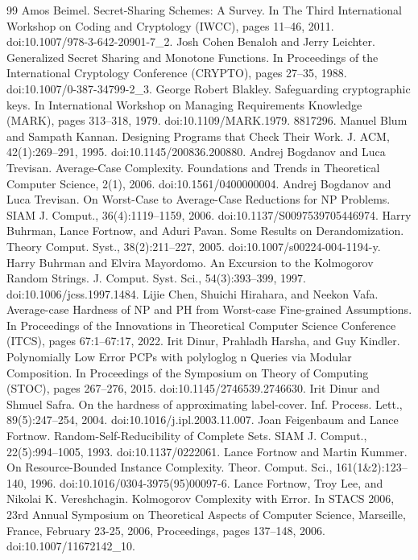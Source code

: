 \begin{thebibliography}{99}
 Amos Beimel. Secret-Sharing Schemes: A Survey. In The Third International Workshop on Coding and Cryptology (IWCC), pages 11–46, 2011. doi:10.1007/978-3-642-20901-7\_2.
 Josh Cohen Benaloh and Jerry Leichter. Generalized Secret Sharing and Monotone Functions. In Proceedings of the International Cryptology Conference (CRYPTO), pages 27–35, 1988. doi:10.1007/0-387-34799-2\_3.
 George Robert Blakley. Safeguarding cryptographic keys. In International Workshop on Managing Requirements Knowledge (MARK), pages 313–318, 1979. doi:10.1109/MARK.1979. 8817296.
 Manuel Blum and Sampath Kannan. Designing Programs that Check Their Work. J. ACM, 42(1):269–291, 1995. doi:10.1145/200836.200880.
 Andrej Bogdanov and Luca Trevisan. Average-Case Complexity. Foundations and Trends in Theoretical Computer Science, 2(1), 2006. doi:10.1561/0400000004.
 Andrej Bogdanov and Luca Trevisan. On Worst-Case to Average-Case Reductions for NP Problems. SIAM J. Comput., 36(4):1119–1159, 2006. doi:10.1137/S0097539705446974.
 Harry Buhrman, Lance Fortnow, and Aduri Pavan. Some Results on Derandomization. Theory Comput. Syst., 38(2):211–227, 2005. doi:10.1007/s00224-004-1194-y.
 Harry Buhrman and Elvira Mayordomo. An Excursion to the Kolmogorov Random Strings. J. Comput. Syst. Sci., 54(3):393–399, 1997. doi:10.1006/jcss.1997.1484.
 Lijie Chen, Shuichi Hirahara, and Neekon Vafa. Average-case Hardness of NP and PH from Worst-case Fine-grained Assumptions. In Proceedings of the Innovations in Theoretical Computer Science Conference (ITCS), pages 67:1–67:17, 2022.
 Irit Dinur, Prahladh Harsha, and Guy Kindler. Polynomially Low Error PCPs with polyloglog n Queries via Modular Composition. In Proceedings of the Symposium on Theory of Computing (STOC), pages 267–276, 2015. doi:10.1145/2746539.2746630.
 Irit Dinur and Shmuel Safra. On the hardness of approximating label-cover. Inf. Process. Lett., 89(5):247–254, 2004. doi:10.1016/j.ipl.2003.11.007.
 Joan Feigenbaum and Lance Fortnow. Random-Self-Reducibility of Complete Sets. SIAM J. Comput., 22(5):994–1005, 1993. doi:10.1137/0222061.
 Lance Fortnow and Martin Kummer. On Resource-Bounded Instance Complexity. Theor. Comput. Sci., 161(1\&2):123–140, 1996. doi:10.1016/0304-3975(95)00097-6.
 Lance Fortnow, Troy Lee, and Nikolai K. Vereshchagin. Kolmogorov Complexity with Error. In STACS 2006, 23rd Annual Symposium on Theoretical Aspects of Computer Science, Marseille, France, February 23-25, 2006, Proceedings, pages 137–148, 2006. doi:10.1007/11672142\_10.

\end{thebibliography}
